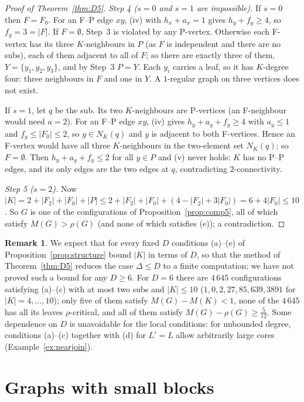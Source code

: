 \documentclass[11pt]{amsart}
\theoremstyle{definition}
\newtheorem{remark}[theorem]{Remark}
\begin{document}
\begin{proof}[Proof of Theorem~\ref{thm:D5}]
\emph{Step 4 ($s=0$ and $s=1$ are impossible).} If $s=0$ then $F=F_0$. For an F--P edge $xy$, (iv) with $h_x+a_x=1$
gives $h_y+f_y\ge4$, so $f_y=3=|F|$. If $F=\emptyset$, Step~3 is violated by any P-vertex. Otherwise each F-vertex
has its three $K$-neighbours in $P$ (as $F$ is independent and there are no subs), each of them adjacent to all of $F$;
so there are exactly three of them, $Y=\{y_1,y_2,y_3\}$, and by Step~3 $P=Y$. Each $y_i$ carries a leaf, so it has
$K$-degree four: three neighbours in $F$ and one in $Y$. A $1$-regular graph on three vertices does not exist.

If $s=1$, let $q$ be the sub. Its two $K$-neighbours are P-vertices (an F-neighbour would need $a=2$). For an F--P
edge $xy$, (iv) gives $h_y+a_y+f_y\ge4$ with $a_y\le1$ and $f_y\le|F_0|\le2$, so $y\in N_K(q)$ and $y$ is adjacent to
both F-vertices. Hence an F-vertex would have all three $K$-neighbours in the two-element set $N_K(q)$; so $F=\emptyset$.
Then $h_y+a_y+f_y\le2$ for all $y\in P$ and (v) never holds: $K$ has no P--P edges, and its only edges are the two edges
at $q$, contradicting $2$-connectivity.

\emph{Step 5 ($s=2$).} Now $|K|=2+|F_2|+|F_0|+|P|\le2+|F_2|+|F_0|+(4-|F_2|+3|F_0|)=6+4|F_0|\le10$. So $G$ is one of the
configurations of Proposition~\ref{prop:comp5}, all of which satisfy $M(G)>\rho(G)$ (and none of which
satisfies (e)); a contradiction.
\end{proof}

\begin{remark}\label{rem:D6}
We expect that for every fixed $D$ conditions (a)--(e) of Proposition~\ref{prop:structure} bound $|K|$ in terms of
$D$, so that the method of Theorem~\ref{thm:D5} reduces the case $\Delta\le D$ to a finite computation; we have not
proved such a bound for any $D\ge6$. For $D=6$ there are $4\,645$ configurations satisfying (a)--(c) with at most
two subs and $|K|\le10$ ($1,0,2,27,85,639,3891$ for $|K|=4,\dots,10$); only five of them satisfy $M(G)-M(K)<1$, none
of the $4\,645$ has all its leaves $\rho$-critical, and all of them satisfy $M(G)-\rho(G)\ge\frac5{12}$. Some
dependence on $D$ is unavoidable for the local conditions: for unbounded degree, conditions (a)--(c) together with
(d) for $L'=L$ allow arbitrarily large cores (Example~\ref{ex:nearjoin}).
\end{remark}

\section{Graphs with small blocks}\label{sec:blocks}
\end{document}

